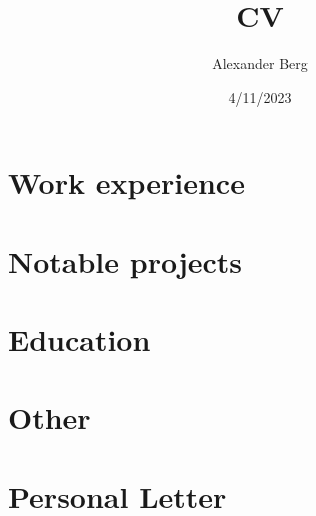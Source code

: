 \documentclass{Style}
\title{CV}
\author{Alexander Berg}
\date{4/11/2023}
\begin{document}


\section{Work experience}



\section{Notable projects}



\section{Education}



\section{Other}




\titlerule

\newpage

\section{Personal Letter}






\end{document}
